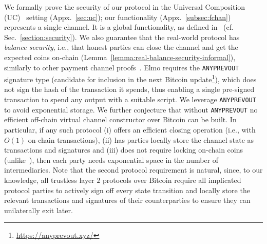   We formally prove the security of our protocol in the Universal
  Composition (UC)~\cite{uc} setting (Appx.~\ref{sec:uc}); our functionality
  \fchan (Appx.~\ref{subsec:fchan}) represents
  a single channel. It is a global functionality,
  as defined in~\cite{DBLP:conf/tcc/BadertscherCHTZ20} (cf.\
  Sec.~\ref{section:security}). We also guarantee that the real-world protocol
  \pchan has \emph{balance security}, i.e., that honest parties can close
  the channel and get the expected coins on-chain
  (Lemma~\ref{lemma:real-balance-security-informal}), similarly to other payment
  channel proofs~\cite{why3ln}.
%
  Elmo requires the \texttt{ANYPREVOUT} signature
  type (candidate for
  inclusion in the next Bitcoin update\footnote{\url{https://anyprevout.xyz/}}), which does not sign the hash of the
  transaction it spends, thus enabling a single pre-signed transaction
  to spend any output with a suitable script. We leverage \texttt{ANYPREVOUT} to
  avoid exponential storage.
  We further conjecture that without
  \texttt{ANYPREVOUT} no efficient off-chain virtual channel constructor
  over Bitcoin can be built. In particular, if any such protocol
  (i) offers an efficient closing operation (i.e., with $O(1)$ on-chain
  transactions), (ii) has parties locally store the channel state as transactions and
  signatures and (iii) does not require locking on-chain
  coins (unlike~\cite{donner}), then each party needs exponential
  space in the number of intermediaries. Note that the second protocol
  requirement is natural, since, to our knowledge, all trustless layer $2$
  protocols over Bitcoin require all implicated protocol parties to actively
  sign off every state transition and locally store the relevant transactions
  and signatures of their counterparties to ensure they can
  unilaterally exit later.
